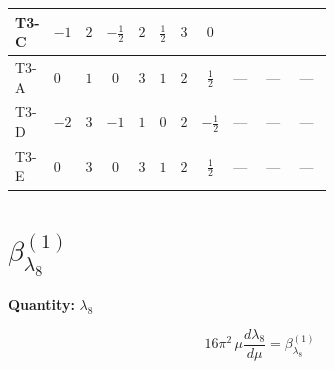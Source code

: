 \documentclass[8pt]{article}
\begin{document}
\begin{landscape}
\begin{longtable}{@{}llcccccc >{\raggedright\arraybackslash}p{0.21\linewidth} >{\raggedright\arraybackslash}p{0.21\linewidth} >{\raggedright\arraybackslash}p{0.21\linewidth}@{}}
T3-C & $-1$ & $2$ & $-\frac{1}{2}$ & $2$ & $\frac{1}{2}$ & $3$ & $0$ & \scriptsize\adjustbox{max width=\linewidth}{$\begin{gathered} +{\lambda_{HS_2}^{(1)}} (4 {\lambda_{H H^\dagger S_1^\dagger S_2^\dagger}^{\rm Cross}}+3 {\lambda_{10}})\end{gathered}$} & \scriptsize\adjustbox{max width=\linewidth}{$\begin{gathered} +{\lambda_{HS_2}^{(A)}} \left(-\frac{3 {\lambda_{H H^\dagger S_1^\dagger S_2^\dagger}^{\rm Cross}}}{2}-\frac{3 {\lambda_{10}}}{4}\right)\end{gathered}$} & \scriptsize\adjustbox{max width=\linewidth}{$\begin{gathered} -6 {\lambda_7} {\lambda_5}\end{gathered}$} \\
\midrule
T3-A & $0$ & $1$ & $0$ & $3$ & $1$ & $2$ & $\frac{1}{2}$ & --- & --- & --- \\
\midrule
T3-D & $-2$ & $3$ & $-1$ & $1$ & $0$ & $2$ & $-\frac{1}{2}$ & --- & --- & --- \\
\midrule
T3-E & $0$ & $3$ & $0$ & $3$ & $1$ & $2$ & $\frac{1}{2}$ & --- & --- & --- \\
\midrule
\bottomrule
\end{longtable}
\clearpage
\section*{$\beta_{\lambda_{8}}^{(1)}$}
\noindent\textbf{Quantity: }$\lambda_{8}$\par\smallskip
\[16\pi^2\,\mu\frac{d \lambda_{8}}{d\mu}=\beta_{\lambda_{8}}^{(1)}\]

\end{landscape}
\end{document}
